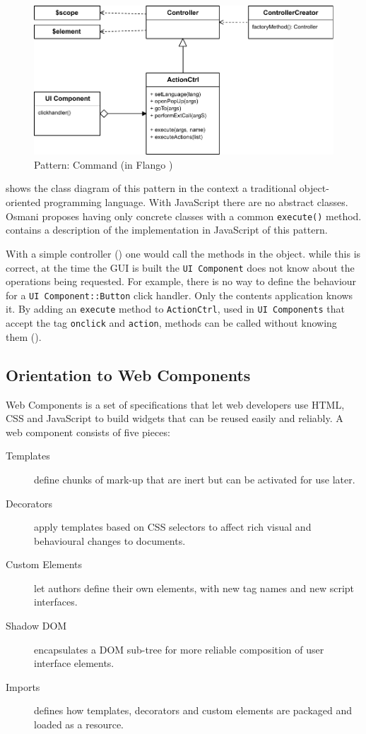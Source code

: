 \begin{figure}[htb]
    \centering
    \includegraphics{figures/design-patterns-command-flango.pdf}
    \caption{Pattern: Command (in Flango \cm)}
    \label{fig:design-command-flango}
\end{figure}

 shows the class diagram of this pattern in the context a traditional object-oriented programming language.
With JavaScript there are no abstract classes.
Osmani \cite{Osmani:2012} proposes having only concrete classes with a common \texttt{execute()} method.
 contains a description of the implementation in JavaScript of this pattern.

With a simple controller () one would call the methods in the object.
while this is correct, at the time the \ac{GUI} is built the \texttt{UI Component} does not know about the operations being requested.
For example, there is no way to define the behaviour for a \texttt{UI Component::Button} click handler.
Only the contents application knows it.
By adding an \texttt{execute} method to \texttt{ActionCtrl}, used in \texttt{UI Components} that accept the tag \texttt{onclick} and \texttt{action}, methods can be called without knowing them ().

\subsection{Orientation to Web Components}
Web Components is a set of specifications that let web developers use \ac{HTML}, \ac{CSS} and JavaScript to build widgets that can be reused easily and reliably.
A web component consists of five pieces\cite{W3CComponents:2013}:
\begin{description}
    \item[Templates] define chunks of mark-up that are inert but can be activated for use later.
    \item[Decorators] apply templates based on CSS selectors to affect rich visual and behavioural changes to documents.
    \item[Custom Elements] let authors define their own elements, with new tag names and new script interfaces.
    \item[Shadow DOM]  encapsulates a DOM sub-tree for more reliable composition of user interface elements.
    \item[Imports] defines how templates, decorators and custom elements are packaged and loaded as a resource.
\end{description}

